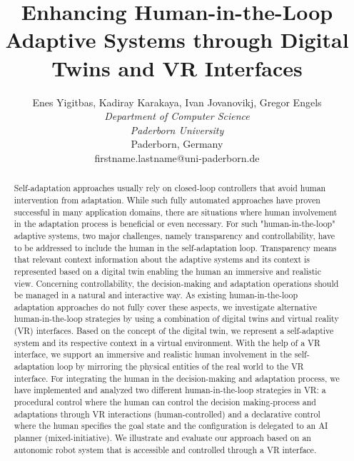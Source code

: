 \documentclass[10pt, conference]{IEEEtran}
\begin{document}


\title{Enhancing Human-in-the-Loop Adaptive Systems through Digital Twins and VR Interfaces
}

\author{Enes Yigitbas, Kadiray Karakaya, Ivan Jovanovikj, Gregor Engels  \\
\textit{Department of Computer Science} \\
\textit{Paderborn University}\\
Paderborn, Germany \\
firstname.lastname@uni-paderborn.de}

\maketitle

\begin{abstract}
Self-adaptation approaches usually rely on closed-loop controllers that avoid human intervention from adaptation. While such fully automated approaches have proven successful in many application domains, there are situations where human involvement in the adaptation process is beneficial or even necessary. For such "human-in-the-loop" adaptive systems, two major challenges, namely transparency and controllability, have to be addressed to include the human in the self-adaptation loop. Transparency means that relevant context information about the adaptive systems and its context is represented based on a digital twin enabling the human an immersive and realistic view. Concerning controllability, the decision-making and adaptation operations should be managed in a natural and interactive way. As existing human-in-the-loop adaptation approaches do not fully cover these aspects, we investigate alternative human-in-the-loop strategies by using a combination of digital twins and virtual reality (VR) interfaces. Based on the concept of the digital twin, we represent a self-adaptive system and its respective context in a virtual environment. With the help of a VR interface, we support an immersive and realistic human involvement in the self-adaptation loop by mirroring the physical entities of the real world to the VR interface. For integrating the human in the decision-making and adaptation process, we have implemented and analyzed two different human-in-the-loop strategies in VR: a procedural control where the human can control the decision making-process and adaptations through VR interactions (human-controlled) and a declarative control where the human specifies the goal state and the configuration is delegated to an AI planner (mixed-initiative). We illustrate and evaluate our approach based on an autonomic robot system that is accessible and controlled through a VR interface. 
\end{abstract}
\end{document}
